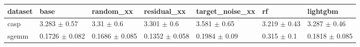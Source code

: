 \begin{tabular}{lllllll}
\toprule
dataset & base & random\_xx & residual\_xx & target\_noise\_xx & rf & lightgbm \\
\midrule
casp & 3.283 $\pm$ 0.57 & 3.31 $\pm$ 0.6 & 3.301 $\pm$ 0.6 & 3.581 $\pm$ 0.65 & 3.219 $\pm$ 0.43 & 3.287 $\pm$ 0.46 \\
sgemm & 0.1726 $\pm$ 0.082 & 0.1686 $\pm$ 0.085 & 0.1352 $\pm$ 0.058 & 0.1984 $\pm$ 0.09 & 0.315 $\pm$ 0.1 & 0.1818 $\pm$ 0.085 \\
\bottomrule
\end{tabular}
